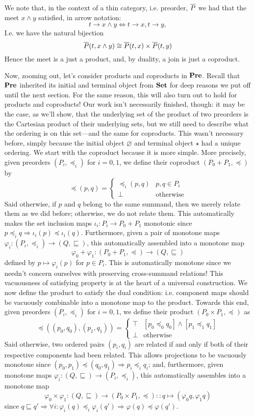 We note that, in the context of a thin category, i.e. preorder, $\overline{P}$ we had that the meet $x\wedge y$ satisfied, in arrow notation:
\[t\to x\wedge y\Leftrightarrow t\to x, t\to y,\]
I.e. we have the natural bijection
\[\overline{P}(t,x\wedge y)\cong \overline{P}(t,x)\times\overline{P}(t,y)\]
Hence the meet is a just a product, and, by duality, a join is just a coproduct.

Now, zooming out, let's consider products and coproducts in $\mathbf{Pre}$. Recall that $\mathbf{Pre}$ inherited its initial and terminal object from $\mathbf{Set}$ for deep reasons we put off until the next section. For the same reason, this will also turn out to hold for products and coproducts! Our work isn't necessarily finished, though: it may be the case, as we'll show, that the underlying set of the product of two preorders is the Cartesian product of their underlying sets, but we still need to describe what the ordering is on this set---and the same for coproducts. This wasn't necessary before, simply because the initial object $\varnothing$ and terminal object $\star$ had a unique ordering. We start with the coproduct because it is more simple. More precisely, given preorders $(P_i,\preceq_i)$ for $i=0,1$, we define their coproduct $(P_0+P_1,\preceq)$ by
\[\preceq(p,q) = \begin{cases} \preceq_i(p,q) & p,q\in P_i \\ \bot & \text{otherwise}\end{cases}\]
Said otherwise, if $p$ and $q$ belong to the same summand, then we merely relate them as we did before; otherwise, we do not relate them. This automatically makes the set inclusion maps $\iota_i:P_i\to P_0+P_1$ monotonic since $p\preceq_i q\Rightarrow \iota_i(p)\preceq\iota_i(q)$. Furthermore, given a pair of monotone maps $\varphi_i:(P_i,\preceq_i)\to(Q,\sqsubseteq)$, this automatically assembled into a monotone map 
\[\varphi_0+\varphi_1:(P_0+P_1,\preceq)\to(Q,\sqsubseteq)\] defined by $p\mapsto \varphi_i(p)$ for $p\in P_i$. This is automatically monotone since we needn't concern ourselves with preserving cross-summand relations! This vacuousness of satisfying property is at the heart of a universal construction. We now define the product to satisfy the dual condition: i.e. component maps should be vacuously combinable into a monotone map to the product. Towards this end, given  preorders $(P_i,\preceq_i)$ for $i=0,1$, we define their product $(P_0\times P_1,\preceq)$ as
\[\preceq((p_0,q_0),(p_1,q_1))=\begin{cases}\top & [p_0\preceq_0 q_0]\wedge [p_1\preceq_1 q_1] \\ \bot & \text{otherwise} \end{cases}\]
Said otherwise, two ordered pairs $(p_i,q_i)$ are related if and only if both of their respective components had been related. This allows projections to be vacuously monotone since $(p_0,p_1)\preceq (q_0,q_1)\Rightarrow p_i\preceq_i q_i$; and, furthermore, given monotone maps $\varphi_i:(Q,\sqsubseteq)\to (P_i,\preceq_i)$, this automatically assembles into a monotone map
\[\varphi_0\times\varphi_1:(Q,\sqsubseteq)\to(P_0\times P_1,\preceq)::q\mapsto (\varphi_0q,\varphi_1q)\]
since $q\sqsubseteq q'\Rightarrow\forall i:\varphi_i(q)\preceq_i\varphi_i(q')\Rightarrow \varphi(q)\preceq\varphi(q')$. 

